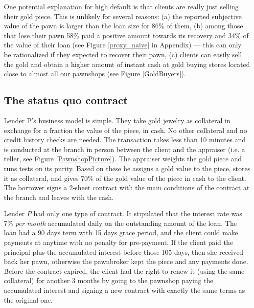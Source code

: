 \documentclass[oneside,11pt]{article}
\begin{document}
One potential explanation for high default is that clients are really just selling their gold piece. This is unlikely for several reasons: (a) the reported subjective value of the pawn is larger than the loan size for 86\% of them, (b) among those that lose their pawn 58\% paid a positive amount towards its recovery and  34\% of the value of their loan (see Figure \ref{proxy_naive} in Appendix) --- this can only be rationalized if they expected to recover their pawn, (c) clients can easily sell the gold and obtain a higher amount of instant cash at gold buying stores located close to almost all our pawnshops (see Figure \ref{GoldBuyers}). %


\subsection{The status quo contract}

Lender P's business model is simple. They take gold jewelry as collateral in exchange for a fraction the value of the piece, in cash. No other collateral and no credit history checks are needed. The transaction takes less than 10 minutes and is conducted at the branch in person between the client and the appraiser (i.e. a teller, see Figure \ref{PawnshopPicture}). The appraiser weights the gold piece and runs tests on its purity. Based on these he assigns a gold value to the piece, stores it as collateral, and gives 70\% of the gold value of the piece in cash to the client. The borrower signs a 2-sheet contract with the main conditions of the contract at the branch and leaves with the cash.

Lender $P$ had only one type of contract. It stipulated that the interest rate was 7\% \textit{per month} accumulated daily on the outstanding amount of the loan. The loan had a 90 days term with 15 days grace period, and the client could make payments at anytime with no penalty for pre-payment. If the client paid the principal plus the accumulated interest before those 105 days, then she received back her pawn, otherwise the pawnbroker kept the piece and any payments done. Before the contract expired, the client had the right to renew it (using the same collateral) for another 3 months by going to the pawnshop paying the accumulated interest and signing a new contract with exactly the same terms as the original one. %
\end{document}
